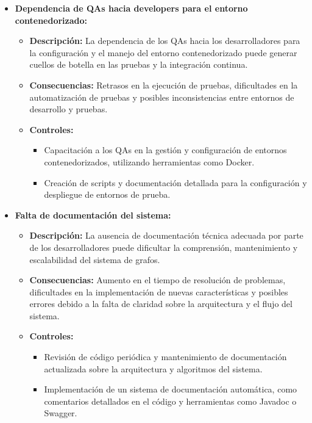 \documentclass[stu, 12pt, letterpaper, donotrepeattitle, floatsintext, natbib]{apa7}
\begin{document}
\begin{itemize}
    \item \textbf{Dependencia de QAs hacia developers para el entorno contenedorizado:}
    \begin{itemize}
        \item \textbf{Descripción:} La dependencia de los QAs hacia los desarrolladores para la configuración y el manejo del entorno contenedorizado puede generar cuellos de botella en las pruebas y la integración continua.
        \item \textbf{Consecuencias:} Retrasos en la ejecución de pruebas, dificultades en la automatización de pruebas y posibles inconsistencias entre entornos de desarrollo y pruebas.
        \item \textbf{Controles:}
        \begin{itemize}
            \item Capacitación a los QAs en la gestión y configuración de entornos contenedorizados, utilizando herramientas como Docker.
            \item Creación de scripts y documentación detallada para la configuración y despliegue de entornos de prueba.
        \end{itemize}
    \end{itemize}

    \item \textbf{Falta de documentación del sistema:}
    \begin{itemize}
        \item \textbf{Descripción:} La ausencia de documentación técnica adecuada por parte de los desarrolladores puede dificultar la comprensión, mantenimiento y escalabilidad del sistema de grafos.
        \item \textbf{Consecuencias:} Aumento en el tiempo de resolución de problemas, dificultades en la implementación de nuevas características y posibles errores debido a la falta de claridad sobre la arquitectura y el flujo del sistema.
        \item \textbf{Controles:}
        \begin{itemize}
            \item Revisión de código periódica y mantenimiento de documentación actualizada sobre la arquitectura y algoritmos del sistema.
            \item Implementación de un sistema de documentación automática, como comentarios detallados en el código y herramientas como Javadoc o Swagger.
        \end{itemize}
    \end{itemize}
\end{itemize}
\end{document}
